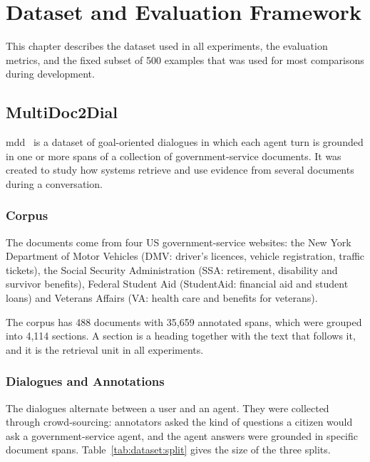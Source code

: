 
\chapter{Dataset and Evaluation Framework}\label{ch:dataset}

This chapter describes the dataset used in all experiments, the evaluation metrics, and
the fixed subset of 500 examples that was used for most comparisons during development.


\section{MultiDoc2Dial}\label{sec:dataset:mdd}

\Gls{mdd}~\cite{feng2021multidoc2dial} is a dataset of goal-oriented dialogues in which
each agent turn is grounded in one or more spans of a collection of government-service
documents. It was created to study how systems retrieve and use evidence from several
documents during a conversation.

\subsection{Corpus}

The documents come from four US government-service websites: the New York Department of
Motor Vehicles (DMV: driver's licences, vehicle registration, traffic tickets), the
Social Security Administration (SSA: retirement, disability and survivor benefits),
Federal Student Aid (StudentAid: financial aid and student loans) and Veterans Affairs
(VA: health care and benefits for veterans).

The corpus has 488 documents with 35{,}659 annotated spans, which were grouped into
4{,}114 sections. A section is a heading together with the text that follows it, and it
is the retrieval unit in all experiments.

\subsection{Dialogues and Annotations}

The dialogues alternate between a user and an agent. They were collected through
crowd-sourcing: annotators asked the kind of questions a citizen would ask a
government-service agent, and the agent answers were grounded in specific document spans.
Table~\ref{tab:dataset:split} gives the size of the three splits.

